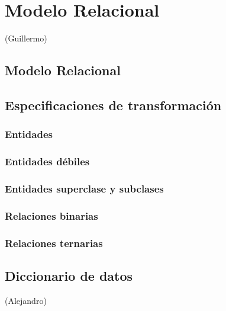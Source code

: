 \section{Modelo Relacional} (Guillermo)
\subsection{Modelo Relacional}
\subsection{Especificaciones de transformación}
\subsubsection{Entidades}
\subsubsection{Entidades débiles}
\subsubsection{Entidades superclase y subclases}
\subsubsection{Relaciones binarias}
\subsubsection{Relaciones ternarias}
\subsection{Diccionario de datos} (Alejandro)

